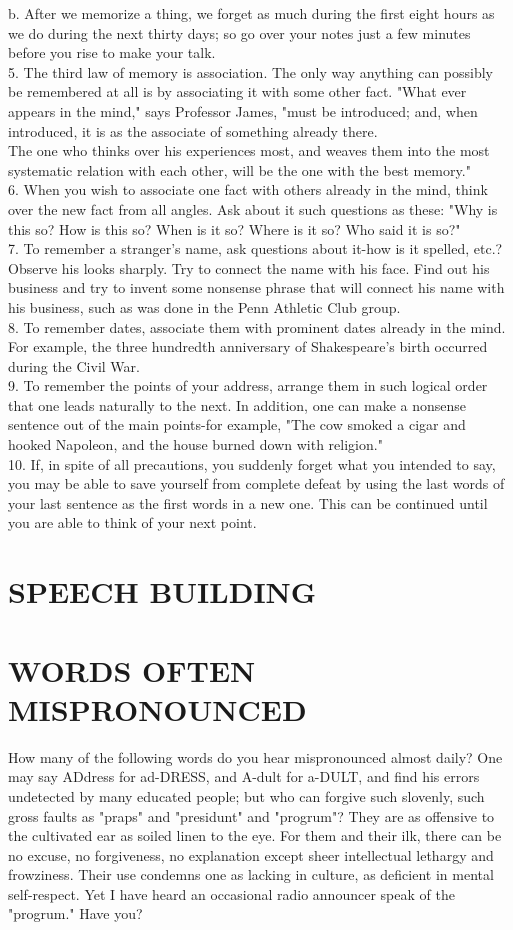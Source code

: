 \documentclass[10pt]{article}
\begin{document}
b. After we memorize a thing, we forget as much during the first eight hours as we do during the next thirty days; so go over your notes just a few minutes before you rise to make your talk.\\
5. The third law of memory is association. The only way anything can possibly be remembered at all is by associating it with some other fact. "What ever appears in the mind," says Professor James, "must be introduced; and, when introduced, it is as the associate of something already there.\\
The one who thinks over his experiences most, and weaves them into the most systematic relation with each other, will be the one with the best memory."\\
6. When you wish to associate one fact with others already in the mind, think over the new fact from all angles. Ask about it such questions as these: "Why is this so? How is this so? When is it so? Where is it so? Who said it is so?"\\
7. To remember a stranger's name, ask questions about it-how is it spelled, etc.? Observe his looks sharply. Try to connect the name with his face. Find out his business and try to invent some nonsense phrase that will connect his name with his business, such as was done in the Penn Athletic Club group.\\
8. To remember dates, associate them with prominent dates already in the mind. For example, the three hundredth anniversary of Shakespeare's birth occurred during the Civil War.\\
9. To remember the points of your address, arrange them in such logical order that one leads naturally to the next. In addition, one can make a nonsense sentence out of the main points-for example, "The cow smoked a cigar and hooked Napoleon, and the house burned down with religion."\\
10. If, in spite of all precautions, you suddenly forget what you intended to say, you may be able to save yourself from complete defeat by using the last words of your last sentence as the first words in a new one. This can be continued until you are able to think of your next point.

\section*{SPEECH BUILDING}
\section*{WORDS OFTEN MISPRONOUNCED}
How many of the following words do you hear mispronounced almost daily? One may say ADdress for ad-DRESS, and A-dult for a-DULT, and find his errors undetected by many educated people; but who can forgive such slovenly, such gross faults as "praps" and "presidunt" and "progrum"? They are as offensive to the cultivated ear as soiled linen to the eye. For them and their ilk, there can be no excuse, no forgiveness, no explanation except sheer intellectual lethargy and frowziness. Their use condemns one as lacking in culture, as deficient in mental self-respect. Yet I have heard an occasional radio announcer speak of the "progrum." Have you?
\end{document}
